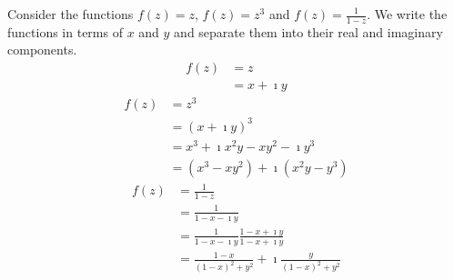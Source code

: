 \begin{Example}
  Consider the functions $f(z) = z$, $f(z) = z^3$ and $f(z) = \frac{1}{1-z}$.
  We write the functions in terms of $x$ and $y$ and 
  separate them into their real and imaginary components.
  \begin{align*}
    f(z)    
    &= z 
    \\
    &= x + \imath y
  \end{align*}
  \begin{align*}
    f(z)    
    &= z^3 
    \\
    &= (x + \imath y)^3 
    \\
    &= x^3 + \imath x^2 y - x y^2 - \imath y^3 
    \\
    &= \left( x^3 - x y^2 \right) + \imath \left(x^2 y - y^3 \right)
  \end{align*}
  \begin{align*}
    f(z)    
    &= \frac{1}{1-z} 
    \\
    &= \frac{1}{1 - x - \imath y} 
    \\
    &= \frac{1}{1 - x - \imath y}  \frac{1 - x + \imath y}{1 - x + \imath y} 
    \\
    &= \frac{1-x}{(1-x)^2 + y^2} + \imath \frac{y}{(1-x)^2 + y^2}
  \end{align*}
\end{Example}






